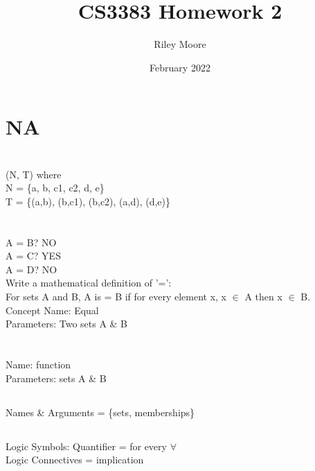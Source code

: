 \documentclass{article}
\title{CS3383 Homework 2}
\author{Riley Moore}
\date{February 2022}
\begin{document}
\maketitle

\section{NA}

\section{}
(N, T) where\\
N = \{a, b, c1, c2, d, e\} \\    
T = \{(a,b), (b,c1), (b,c2), (a,d), (d,e)\}

\section{\normalfont}
A = B? NO\\
A = C? YES\\
A = D? NO\\
Write a mathematical definition of '=':\\
For sets A and B, A is = B if for every element x, x $\in$  A then  x $\in$ B.\\
Concept Name: Equal\\
Parameters: Two sets A \& B


\section{}


\section{}
\subsection{}
Name: function \\
Parameters: sets A \& B
\subsection{}
Names \& Arguments = \{sets, memberships\}
\subsection{}
Logic Symbols: Quantifier = for every $\forall$ \\
               Logic Connectives = implication
\end{document}
